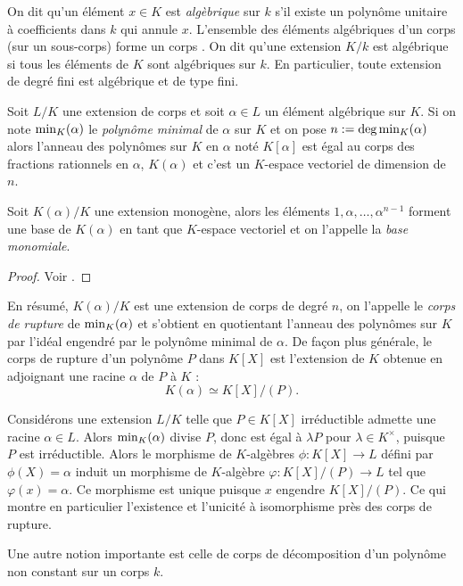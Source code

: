 \documentclass[a4paper]{article} %
\numberwithin{section}{part}
\numberwithin{equation}{section}
\newcommand\Irr[2]{\textup{min}_{#1}(#2)}
\begin{document}
On dit qu'un élément $x\in K$ est \emph{algèbrique} sur $k$ s'il existe un 
polynôme unitaire à coefficients dans $k$ qui annule $x$. L'ensemble des 
éléments algébriques d'un corps (sur un sous-corps) forme un corps \cite[p.~64, 
théorème 1.14]{Per}. On dit qu'une extension $K/k$ est algébrique si tous les 
éléments de $K$ sont algébriques sur $k$. En particulier, toute extension de
degré fini est algébrique et de type fini.\par
Soit $L/K$ une extension de corps et soit $\alpha\in L$ un élément algébrique 
sur $K$. Si on note $\Irr{K}{\alpha}$ le \emph{polynôme minimal} de $\alpha$ sur
$K$ et on pose $n := \textup{deg\,}\Irr{K}{\alpha}$ alors l'anneau des polynômes
sur $K$ en $\alpha$ noté $K[\alpha]$ est égal au corps des fractions rationnels
en $\alpha$, $K(\alpha)$ et c'est un $K$-espace vectoriel de dimension de $n$.
\begin{defnp}
Soit $K(\alpha)/K$ une extension monogène, alors les éléments 
$1,\alpha,\dots,\alpha^{n-1}$ forment une base de $K(\alpha)$ en tant que
$K$-espace vectoriel et on l'appelle la \emph{base monomiale}.
\end{defnp}
\begin{proof}
Voir \cite[III, th. 1.11]{Per}.
\end{proof}

En résumé, $K(\alpha)/K$ est une extension de corps de
degré $n$, on l'appelle le \emph{corps de rupture} de $\Irr{K}{\alpha}$ et
s'obtient en quotientant l'anneau des polynômes sur $K$ par l'idéal engendré par
le polynôme minimal de $\alpha$. De façon plus générale, le corps de rupture 
d'un polynôme $P$ dans $K[X]$ est l'extension de $K$ obtenue en adjoignant une 
racine $\alpha$ de $P$ à $K$ :
\begin{equation}
K(\alpha)\simeq K[X]/(P).
\end{equation}

Considérons une extension $L/K$ telle que $P\in K[X]$ irréductible admette une 
racine $\alpha\in L$. Alors $\Irr{K}{\alpha}$ divise $P$, donc est égal à 
$\lambda P$ pour $\lambda\in K^{\times}$, puisque $P$ est irréductible. Alors 
le morphisme de $K$-algèbres $\phi : K[X] \to L$ défini par $\phi(X) = \alpha$ 
induit un morphisme de $K$-algèbre $\varphi : K[X]/(P) \to L$ tel que 
$\varphi(x) = \alpha$. Ce morphisme est unique puisque $x$ engendre $K[X]/(P)$. 
Ce qui montre en particulier l'existence et l'unicité à isomorphisme près des 
corps de rupture.\par
\vspace{0.3cm}
Une autre notion importante est celle de corps de décomposition d'un polynôme 
non constant sur un corps $k$.
\end{document}
